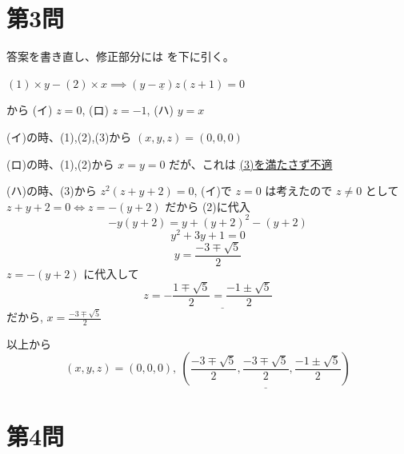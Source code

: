 \documentclass[../main.tex]{subfiles}
\begin{document}
\newpage

\section*{第3問}

\noindent
[\textbf{解}] 答案を書き直し、修正部分には \underline{\hspace{0.8cm}} を下に引く。

\vspace{0.3cm}

\noindent
$(1)\times y - (2)\times x \implies (y-\underline{x})z(z+1)=0$

\noindent
から (イ) $z=0$, (ロ) $z=-1$, (ハ) $y=x$

\vspace{0.3cm}

\noindent
(イ)の時、(1),(2),(3)から $(x,y,z)=(0,0,0)$

\noindent
(ロ)の時、(1),(2)から $x=y=0$ だが、これは \underline{(3)を満たさず不適}

\noindent
(ハ)の時、(3)から $z^2(z+y+2)=0$, (イ)で $z=0$ は考えたので $z \neq 0$ として $z+y+2=0 \iff z=-(y+2)$ だから (2)に代入
\[
  -y(y+2) = y + (y+2)^2 - (y+2)
\]
\[
  y^2 + 3y + 1 = 0
\]
\[
  y = \frac{-3 \mp \sqrt{5}}{2}
\]
$z=-(y+2)$ に代入して
\[
  z = - \underline{\frac{1 \mp \sqrt{5}}{2} = \frac{-1 \pm \sqrt{5}}{2}}
\]
だから, $x = \frac{-3 \mp \sqrt{5}}{2}$

\vspace{0.3cm}

\noindent
以上から
\[
  (x,y,z) = (0,0,0), \ \underline{\left( \frac{-3 \mp \sqrt{5}}{2}, \frac{-3 \mp \sqrt{5}}{2}, \frac{-1 \pm \sqrt{5}}{2} \right)}
\]

\newpage

\section*{第4問}
\end{document}
